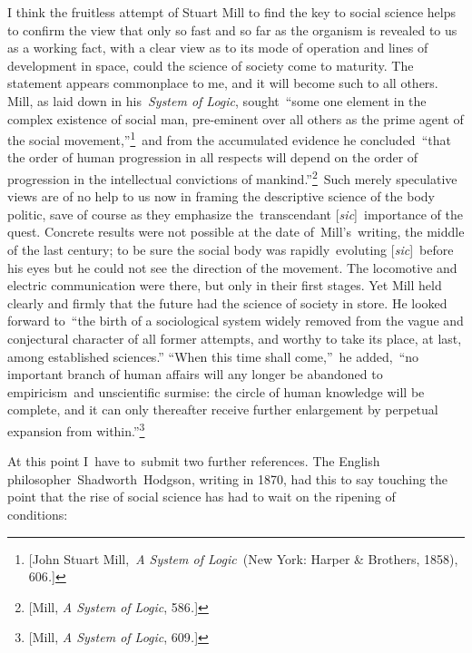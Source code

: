 \documentclass[openany,nobib]{tufte-book}
\begin{document}
I think the fruitless attempt of Stuart Mill to find the key to social
science helps to confirm the view that only so fast and so far as the
organism is revealed to us as a working fact, with a clear view as to
its mode of operation and lines of development in space, could the
science of society come to maturity. The statement appears commonplace
to me, and it will become such to all others. Mill, as laid down in
his~\emph{System of Logic}, sought~``some one element in the complex
existence of social man, pre-eminent over all others as the prime agent
of the social movement,''\footnote{{[}John Stuart Mill,~\emph{A System
  of Logic~}(New York: Harper \& Brothers, 1858), 606\emph{.}{]}}~and
from the accumulated evidence he concluded~``that the order of human
progression in all respects will depend on the order of progression in
the intellectual convictions of mankind.''\footnote{{[}Mill, \emph{A
  System of Logic}, 586\emph{.}{]}}~Such merely speculative views are of
no help to us now in framing the descriptive science of the body
politic, save of course as they emphasize the~transcendant
{[}\emph{sic}{]}~importance of the quest. Concrete results were not
possible at the date of~Mill's~writing, the middle of the last century;
to be sure the social body was rapidly~evoluting {[}\emph{sic}{]}~before
his eyes but he could not see the direction of the movement. The
locomotive and electric communication were there, but only in their
first stages. Yet Mill held clearly and firmly that the future had the
science of society in store. He looked forward to~``the birth of a
sociological system widely removed from the vague and conjectural
character of all former attempts, and worthy to take its place, at last,
among established sciences.'' ``When this time shall come,''~he
added,~``no important branch of human affairs will any longer be
abandoned to empiricism~and unscientific surmise: the circle of human
knowledge will be complete, and it can only thereafter receive further
enlargement by perpetual expansion from within.''\footnote{{[}Mill,
  \emph{A System of Logic}, 609\emph{.}{]}}~

At this point I~have to~submit two further references. The English
philosopher~Shadworth~Hodgson, writing in 1870, had this to say touching
the point that the rise of social science has had to wait on the
ripening of conditions:~
\end{document}
